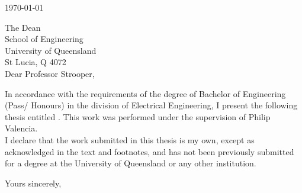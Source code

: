 \begin{flushright}
	
	\medskip
	\today
\end{flushright}
\begin{flushleft}
  The Dean\\
  School of Engineering\\
  University of Queensland\\
  St Lucia, Q 4072\\
  \bigskip\bigskip
  Dear Professor Strooper,
\end{flushleft}

In accordance with the requirements of the degree of Bachelor of
Engineering (Pass/ Honours) in the division of Electrical Engineering, I present the
following thesis entitled \Title . This work was performed  under the supervision of Philip Valencia.  \\

I declare that the work submitted in this thesis is my own, except as acknowledged in the text and footnotes, and has not been previously submitted for a degree at the University of Queensland or any other institution.

\begin{flushright}
	Yours sincerely,\\
	 \bigskip\bigskip\bigskip
	\Author
\end{flushright}
